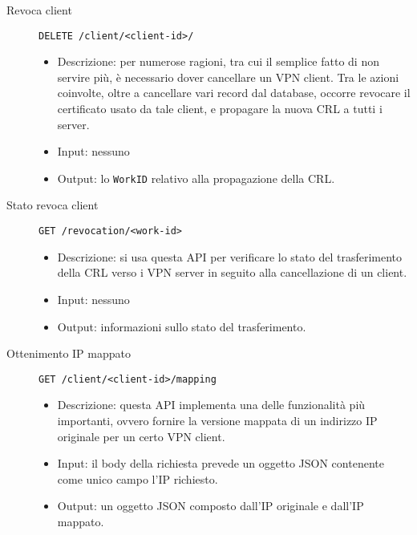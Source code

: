 \begin{description}
    \item[Revoca client]\texttt{DELETE /client/<client-id>/}
    \begin{itemize}
        \item Descrizione: per numerose ragioni, tra cui il semplice fatto
        di non servire più, è necessario dover cancellare un VPN client.
        Tra le azioni coinvolte, oltre a cancellare vari record dal database,
        occorre revocare il certificato usato da tale client, e propagare la
        nuova CRL a tutti i server.
        \item Input: nessuno
        \item Output: lo \texttt{WorkID} relativo alla propagazione della CRL.
    \end{itemize}

    \item[Stato revoca client]\texttt{GET /revocation/<work-id>}
    \begin{itemize}
        \item Descrizione: si usa questa API per verificare lo stato
        del trasferimento della CRL verso i VPN server in seguito alla
        cancellazione di un client.
        \item Input: nessuno
        \item Output: informazioni sullo stato del trasferimento.
    \end{itemize}

    \item[Ottenimento IP mappato]\texttt{GET /client/<client-id>/mapping}
    \begin{itemize}
        \item Descrizione: questa API implementa una delle funzionalità
        più importanti, ovvero fornire la versione mappata di un indirizzo
        IP originale per un certo VPN client.
        \item Input: il body della richiesta prevede un oggetto JSON contenente
        come unico campo l'IP richiesto.
        \item Output: un oggetto JSON composto dall'IP originale e dall'IP mappato.
    \end{itemize}


\end{description}
